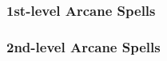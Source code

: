 \subsubsection{1st-level Arcane Spells}
\begin{swspelllist}
    \SLmagearmor[Abjur]
    \SLprotectionfromalignment
    \SLsanctuary
    \SLablativeshield*

    \SLgrease[Conj]
    \SLobscuringmist
    \SLsummonmonsteri
    \SLretrieveobject*

    \spellhead[Div]{}
    \SLlocateobjectlesser
    \SLspellmessage
    \SLprecognitionlesser*

    \SLcommand
    \SLsanctuary
    \SLsleep
    \SLforget*

    \SLburninghands[Evoc]
    \SLmagehand
    \SLmagicmissile
    \SLshockinggrasp
    \SLfeatherfall*

    \SLcolorspray[Illus]
    \SLdancinglights
    \SLventriloquism
    \SLcreatesound*

    \SLenfeeblement[Necro]
    \SLghoultouch
    \SLinflictlightwounds
    \SLunlivingheart*

    \SLexpeditiousretreat[Trans]
    \SLmagicvestment
    \SLreduceperson*
\end{swspelllist}

\subsubsection{2nd-level Arcane Spells} 
\begin{swspelllist}
    \SLinertialshield[Abjur]
    \SLresistenergy
    \SLsharepain
    \SLablateimpact*

    \SLacidarrow[Conj]
    \SLfogcloud
    \SLglitterdust
    \SLsummonmonsterii
    \SLretrieveally*

    \SLdarkvision[Div]
    \SLlocatecreature
    \SLprecognitionlesser
    \SLseeinvisibility
    \SLforeseeprobability*

    \SLagony[Ench]
    \SLcalmemotions
    \SLholdperson
    \SLtouchofidiocy
    \SLcharmperson*

    \SLscorchingray[Evoc]
    \SLinterposinghand
    \SLsoundburst
    \SLknock*

    \SLblur[Illus]
    \SLmirrorimage
    \SLphantasmalwound
    \SLsilentimage*

    \SLblindnessdeafness[Necro]
    \SLinflictmoderatewounds
    \SLsharepain
    \SLdeathknell*

    \SLmagicweapon[Trans]
    \SLspiderclimb
    \SLtotemicmind
    \SLtotemicpower
    \SLslow
    \SLenlargeperson*
\end{swspelllist}

